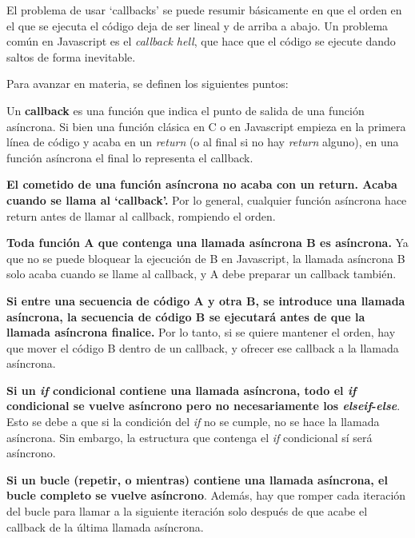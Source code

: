 \documentclass{report}
\begin{document}
	El problema de usar `callbacks' se puede resumir básicamente en que el orden en el que se ejecuta el código deja de ser lineal y de arriba a abajo. Un problema común en Javascript es el \textit{callback hell}\cite{callbackhell}, que hace que el código se ejecute dando saltos de forma inevitable. 
	
	Para avanzar en materia, se definen los siguientes puntos:
	
	\noindent
	Un \textbf{callback} es una función que indica el punto de salida de una función asíncrona. Si bien una función clásica en C o en Javascript empieza en la primera línea de código y acaba en un \textit{return} (o al final si no hay \textit{return} alguno), en una función asíncrona el final lo representa el callback.  
	
	\vspace{10px}
	
	\noindent
	\textbf{El cometido de una función asíncrona no acaba con un return. Acaba cuando se llama al `callback'.} Por lo general, cualquier función asíncrona hace return antes de llamar al callback, rompiendo el orden.
	
	\vspace{10px}
	
	\noindent
	\textbf{Toda función A que contenga una llamada asíncrona B es asíncrona.} Ya que no se puede bloquear la ejecución de B en Javascript, la llamada asíncrona B solo acaba cuando se llame al callback, y A debe preparar un callback también.
	
	\vspace{10px}
	
	\noindent
	\textbf{Si entre una secuencia de código A y otra B, se introduce una llamada asíncrona, la secuencia de código B se ejecutará antes de que la llamada asíncrona finalice.} Por lo tanto, si se quiere mantener el orden, hay que mover el código B dentro de un callback, y ofrecer ese callback a la llamada asíncrona.
	
	\vspace{10px}
	\noindent
	\textbf{Si un \textit{if} condicional contiene una llamada asíncrona, todo el \textit{if} condicional se vuelve asíncrono pero no necesariamente los \textit{elseif}-\textit{else}}. Esto se debe a que si la condición del \textit{if} no se cumple, no se hace la llamada asíncrona. Sin embargo, la estructura que contenga el \textit{if} condicional sí será asíncrono. 
	
	\vspace{10px}
	\noindent
	\textbf{Si un bucle (repetir, o mientras) contiene una llamada asíncrona, el bucle completo se vuelve asíncrono}. Además, hay que romper cada iteración del bucle para llamar a la siguiente iteración solo después de que acabe el callback de la última llamada asíncrona.
	
\end{document}
